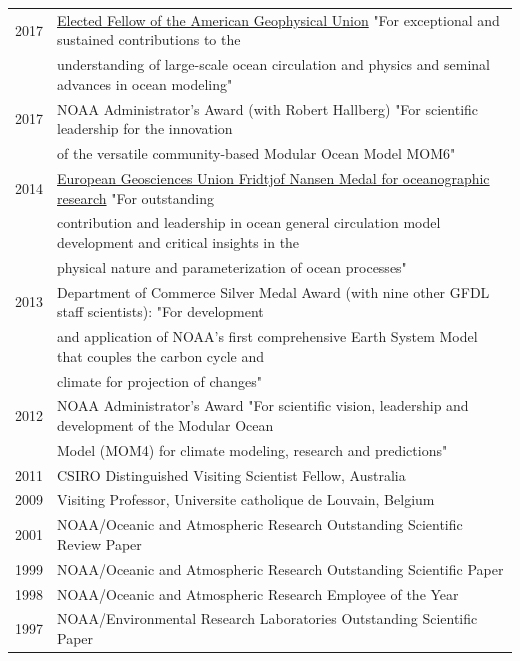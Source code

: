 \documentclass{article}
\begin{document}
\begin{tabular}{ll}
  2017 & \href{https://eos.org/agu-news/celebrating-the-2017-class-of-fellows}{Elected Fellow of the American Geophysical Union} "For exceptional and sustained contributions to the \\ &  understanding of large-scale ocean circulation and physics and seminal advances in ocean modeling"
\\
  2017 & NOAA Administrator's Award (with Robert Hallberg) "For scientific leadership for the innovation \\ & of the versatile  community-based Modular Ocean Model MOM6" 
  \\
  2014 & \href{http://www.egu.eu/awards-medals/fridtjof-nansen/2014/stephen-m-griffies/}{European Geosciences Union Fridtjof Nansen Medal for
         oceanographic research}  "For 
outstanding \\ & contribution and leadership in 
ocean general circulation model development 
and critical insights in the \\ & physical 
nature and parameterization of ocean processes"
\\
  2013 & Department of Commerce Silver Medal Award (with nine other
  GFDL staff scientists): 
  "For development \\ & and application of NOAA's first comprehensive  
  Earth System Model  
  that couples the carbon cycle and \\ & climate for projection of changes" \\
  2012 & NOAA Administrator's Award "For scientific vision, leadership
  and development of 
  the Modular Ocean \\ & Model (MOM4) for climate modeling, research and
  predictions" \\
  2011 & CSIRO Distinguished Visiting Scientist Fellow, Australia \\
  2009 & Visiting Professor, Universite catholique de Louvain, Belgium\\
  2001 & NOAA/Oceanic and Atmospheric Research Outstanding Scientific
  Review Paper\\
  1999 & NOAA/Oceanic and Atmospheric Research Outstanding Scientific Paper\\
  1998 & NOAA/Oceanic and Atmospheric Research Employee of the Year\\
  1997 & NOAA/Environmental Research Laboratories Outstanding Scientific Paper\\
\end{tabular}
\end{document}
